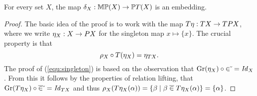 \documentclass{book}
\begin{document}
\begin{proposition}
\label{p:3}
For every set $X$, the map $\delta_{X}: \mathbb{M}\mathbb{P}(X) \to \mathbb{P}T(X)$ is an
embedding.
\end{proposition}
\xxviproofspace
\begin{proof}
   The basic idea of the proof is to work with the map
$T\eta:T X\to T P X$, 
where we write $\eta_X:X\to P X$ 
for the singleton map
$x\mapsto \{x\}$.
The crucial property is that 
\begin{equation}\label{equ:singleton}
  \rho_X\circ T(\eta_X)=\eta_{T X}.
\end{equation}
The proof of (\ref{equ:singleton}) is based on the observation that 
$\mathrm{Gr}(\eta_{X}) \circ {\in}\breve{\hspace*{1mm}} = \mathit{Id}_{X}$.
From this it follows by the properties of relation lifting, that 
$\mathrm{Gr}(T\eta_{X}) \circ \overline{\in}\breve{\hspace*{1mm}} = \mathit{Id}_{T X}$
and thus $\rho_X(T \eta_X(\alpha)) = \{\beta \mid \beta 
\; \overline{\in} \;  
T \eta_X(\alpha) \} = \{\alpha\}$.



\end{proof}
\end{document}
